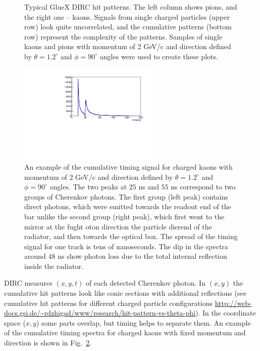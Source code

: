 \begin{figure}[!h]
\caption{\label{pic:hitpat1}
Typical GlueX DIRC hit patterns. The left column shows pions, and the right one -- kaons. Signals from single charged particles (upper row) look quite uncorrelated, and the cumulative patterns (bottom row) represent the complexity of the patterns. Samples of single kaons and pions with momentum of 2 GeV/c and direction defined by $\theta = 1.2^{\circ}$ and $\phi = 90^{\circ}$ angles were used to create these plots.
}
\end{figure}

\begin{figure}[!h]
\centering
\includegraphics[angle=0,width=0.6\textwidth]{pics/Npho_th1_2_ph90.pdf}
\caption{\label{pic:time}
An example of the cumulative timing signal for charged kaons with momentum of 2 GeV/c and direction defined by $\theta = 1.2^{\circ}$ and $\phi = 90^{\circ}$ angles. The two peaks at $25$ ns and $55$ ns correspond to two groups of Cherenkov photons. The first group (left peak) contains direct photons, which were emitted towards the readout end of the bar unlike the second group (right peak), which first went to the mirror at the fught oton direction the particle dierend of the radiator, and then towards the optical box. The spread of the timing signal for one track is tens of nanoseconds. The dip in the spectra around $48$ ns show photon loss due to the total internal reflection inside the radiator. 
}
\end{figure}

DIRC measures $(x,y,t)$ of each detected Cherenkov photon. In $(x,y)$ the cumulative hit patterns look like conic sections with additional reflections (see cumulative hit patterns for different charged particle configurations \url{http://web-docs.gsi.de/~rdzhigad/www/research/hit-pattern-vs-theta-phi}). In the coordinate space ($x ,y$) some parts overlap, but timing helps to separate them.
An example of the cumulative timing spectra for charged kaons with fixed momentum and direction is shown in Fig.~\ref{pic:time}. 

